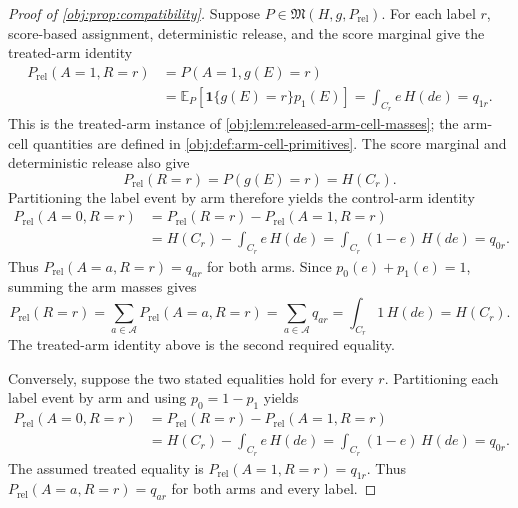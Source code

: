 \documentclass[11pt]{article}
\begin{document}
\begin{proof}[Proof of \cref{obj:prop:compatibility}]
Suppose \(P\in\mathfrak M(H,g,P_{\mathrm{rel}})\). For each label \(r\), score-based assignment, deterministic release, and the score marginal give the treated-arm identity
\[
\begin{aligned}
P_{\mathrm{rel}}(A=1,R=r)
&=P(A=1,g(E)=r)\\
&=\mathbb E_P\!\left[\mathbf 1\{g(E)=r\}p_1(E)\right]
=\int_{C_r}e\,H(de)=q_{1r}.
\end{aligned}
\]
This is the treated-arm instance of \cref{obj:lem:released-arm-cell-masses}; the arm-cell quantities are defined in \cref{obj:def:arm-cell-primitives}. The score marginal and deterministic release also give
\[
P_{\mathrm{rel}}(R=r)=P(g(E)=r)=H(C_r).
\]
Partitioning the label event by arm therefore yields the control-arm identity
\[
\begin{aligned}
P_{\mathrm{rel}}(A=0,R=r)
&=P_{\mathrm{rel}}(R=r)-P_{\mathrm{rel}}(A=1,R=r)\\
&=H(C_r)-\int_{C_r}e\,H(de)
=\int_{C_r}(1-e)\,H(de)=q_{0r}.
\end{aligned}
\]
Thus \(P_{\mathrm{rel}}(A=a,R=r)=q_{ar}\) for both arms.
Since \(p_0(e)+p_1(e)=1\), summing the arm masses gives
\[
P_{\mathrm{rel}}(R=r)
=\sum_{a\in\mathcal A}P_{\mathrm{rel}}(A=a,R=r)
=\sum_{a\in\mathcal A}q_{ar}
=\int_{C_r}1\,H(de)
=H(C_r).
\]
The treated-arm identity above is the second required equality.

Conversely, suppose the two stated equalities hold for every \(r\). Partitioning each label event by arm and using \(p_0=1-p_1\) yields
\[
\begin{aligned}
P_{\mathrm{rel}}(A=0,R=r)
&=P_{\mathrm{rel}}(R=r)-P_{\mathrm{rel}}(A=1,R=r)\\
&=H(C_r)-\int_{C_r}e\,H(de)
=\int_{C_r}(1-e)\,H(de)=q_{0r}.
\end{aligned}
\]
The assumed treated equality is \(P_{\mathrm{rel}}(A=1,R=r)=q_{1r}\). Thus \(P_{\mathrm{rel}}(A=a,R=r)=q_{ar}\) for both arms and every label.


\end{proof}
\end{document}
